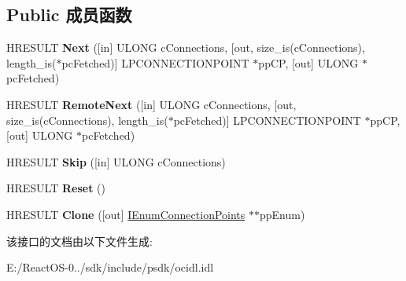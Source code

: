 \subsection*{Public 成员函数}
\begin{DoxyCompactItemize}
\item 
\mbox{\label{interface_i_enum_connection_points_acd39fcb3c022e70ed2dc3d80129d6098}} 
H\+R\+E\+S\+U\+LT {\bfseries Next} (\mbox{[}in\mbox{]} U\+L\+O\+NG c\+Connections, \mbox{[}out, size\+\_\+is(c\+Connections), length\+\_\+is($\ast$pc\+Fetched)\mbox{]} L\+P\+C\+O\+N\+N\+E\+C\+T\+I\+O\+N\+P\+O\+I\+NT $\ast$pp\+CP, \mbox{[}out\mbox{]} U\+L\+O\+NG $\ast$pc\+Fetched)
\item 
\mbox{\label{interface_i_enum_connection_points_a60752f25cf06abd869a38de5ff4547a1}} 
H\+R\+E\+S\+U\+LT {\bfseries Remote\+Next} (\mbox{[}in\mbox{]} U\+L\+O\+NG c\+Connections, \mbox{[}out, size\+\_\+is(c\+Connections), length\+\_\+is($\ast$pc\+Fetched)\mbox{]} L\+P\+C\+O\+N\+N\+E\+C\+T\+I\+O\+N\+P\+O\+I\+NT $\ast$pp\+CP, \mbox{[}out\mbox{]} U\+L\+O\+NG $\ast$pc\+Fetched)
\item 
\mbox{\label{interface_i_enum_connection_points_aa8c55c9440cb3e1864d701b2e7752fd3}} 
H\+R\+E\+S\+U\+LT {\bfseries Skip} (\mbox{[}in\mbox{]} U\+L\+O\+NG c\+Connections)
\item 
\mbox{\label{interface_i_enum_connection_points_af29bcd6f443b2bc664096c8c697ff077}} 
H\+R\+E\+S\+U\+LT {\bfseries Reset} ()
\item 
\mbox{\label{interface_i_enum_connection_points_a8e1c36e753fc2eae5e446709712cd58a}} 
H\+R\+E\+S\+U\+LT {\bfseries Clone} (\mbox{[}out\mbox{]} \hyperlink{interface_i_enum_connection_points}{I\+Enum\+Connection\+Points} $\ast$$\ast$pp\+Enum)
\end{DoxyCompactItemize}


该接口的文档由以下文件生成\+:\begin{DoxyCompactItemize}
\item 
E\+:/\+React\+O\+S-\/0../sdk/include/psdk/ocidl.\+idl\end{DoxyCompactItemize}
